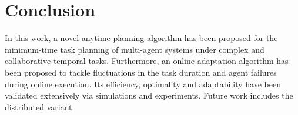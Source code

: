 \section{Conclusion}\label{sec:conclusion}

In this work, a novel anytime planning algorithm has been proposed for
the minimum-time task planning of multi-agent systems
under complex and collaborative temporal tasks.
Furthermore, an online adaptation algorithm has been proposed to tackle
fluctuations in the task duration and agent failures during online execution.
Its efficiency, optimality and adaptability have been validated extensively via
simulations and experiments.
Future work includes the distributed variant.
